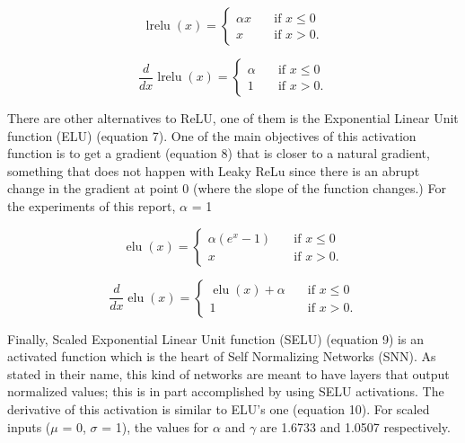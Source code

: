 \documentclass{article}
\DeclareMathOperator{\lrelu}{lrelu}
\DeclareMathOperator{\elu}{elu}
\begin{document}
\begin{equation}
  \lrelu(x) =
     \begin{cases} 
      \alpha x      & \quad \text{if } x \leq  0 \\
      x       & \quad \text{if } x > 0 .
    \end{cases} 
\end{equation}

\begin{equation}
  \frac{d}{dx} \lrelu(x) =
     \begin{cases} 
      \alpha      & \quad \text{if } x \leq  0 \\
      1       & \quad \text{if } x > 0 .
    \end{cases} 
\end{equation}

There are other alternatives to ReLU, one of them is the Exponential Linear Unit function (ELU) (equation 7). One of the main objectives of this activation function is to get a gradient (equation 8) that is closer to a natural gradient, something that does not happen with Leaky ReLu since there is an abrupt change in the gradient at point 0 (where the slope of the function changes.) For the experiments of this report, \(\alpha\) = 1

\begin{equation}
  \elu(x) =
     \begin{cases} 
      \alpha (e^{x} - 1)     & \quad \text{if } x \leq  0 \\
      x       & \quad \text{if } x > 0 .
    \end{cases} 
\end{equation}

\begin{equation}
  \frac{d}{dx} \elu(x) =
     \begin{cases} 
      \elu(x) + \alpha      & \quad \text{if } x \leq  0 \\
      1       & \quad \text{if } x > 0 .
    \end{cases} 
\end{equation}

Finally, Scaled Exponential Linear Unit function (SELU) (equation 9) is an activated function which is the heart of Self Normalizing Networks (SNN). As stated in their name, this kind of networks are meant to have layers that output normalized values; this is in part accomplished by using SELU activations. The derivative of this activation is similar to ELU's one (equation 10). For scaled inputs (\(\mu\) = 0, \(\sigma\) = 1), the values for \(\alpha\) and \(\gamma\) are 1.6733 and 1.0507 respectively.
\end{document}
